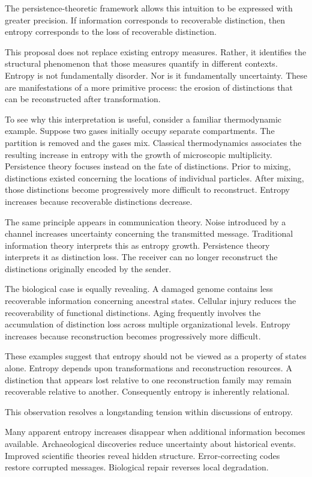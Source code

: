 \documentclass[12pt,oneside]{article}
\theoremstyle{definition}
\begin{document}
The persistence-theoretic framework allows this intuition to be expressed with greater precision. If information corresponds to recoverable distinction, then entropy corresponds to the loss of recoverable distinction.

This proposal does not replace existing entropy measures. Rather, it identifies the structural phenomenon that those measures quantify in different contexts. Entropy is not fundamentally disorder. Nor is it fundamentally uncertainty. These are manifestations of a more primitive process: the erosion of distinctions that can be reconstructed after transformation.

To see why this interpretation is useful, consider a familiar thermodynamic example. Suppose two gases initially occupy separate compartments. The partition is removed and the gases mix. Classical thermodynamics associates the resulting increase in entropy with the growth of microscopic multiplicity. Persistence theory focuses instead on the fate of distinctions. Prior to mixing, distinctions existed concerning the locations of individual particles. After mixing, those distinctions become progressively more difficult to reconstruct. Entropy increases because recoverable distinctions decrease.

The same principle appears in communication theory. Noise introduced by a channel increases uncertainty concerning the transmitted message. Traditional information theory interprets this as entropy growth. Persistence theory interprets it as distinction loss. The receiver can no longer reconstruct the distinctions originally encoded by the sender.

The biological case is equally revealing. A damaged genome contains less recoverable information concerning ancestral states. Cellular injury reduces the recoverability of functional distinctions. Aging frequently involves the accumulation of distinction loss across multiple organizational levels. Entropy increases because reconstruction becomes progressively more difficult.

These examples suggest that entropy should not be viewed as a property of states alone. Entropy depends upon transformations and reconstruction resources. A distinction that appears lost relative to one reconstruction family may remain recoverable relative to another. Consequently entropy is inherently relational.

This observation resolves a longstanding tension within discussions of entropy.

Many apparent entropy increases disappear when additional information becomes available. Archaeological discoveries reduce uncertainty about historical events. Improved scientific theories reveal hidden structure. Error-correcting codes restore corrupted messages. Biological repair reverses local degradation.
\end{document}
